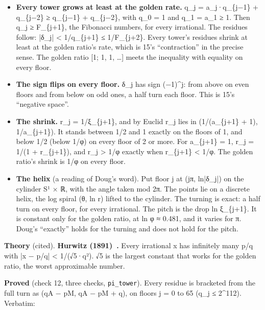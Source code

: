 \begin{itemize}
\item \textbf{Every tower grows at least at the golden rate.} q\_\allowbreak{}j = a\_\allowbreak{}j·q\_\allowbreak{}\{j−1\} + q\_\allowbreak{}\{j−2\} ≥ q\_\allowbreak{}\{j−1\} + q\_\allowbreak{}\{j−2\}, with q\_\allowbreak{}0 = 1 and q\_\allowbreak{}1 = a\_\allowbreak{}1 ≥ 1. Then q\_\allowbreak{}j ≥ F\_\allowbreak{}\{j+1\}, the Fibonacci numbers, for every irrational. The residues follow: |δ\_\allowbreak{}j| < 1/q\_\allowbreak{}\{j+1\} ≤ 1/F\_\allowbreak{}\{j+2\}. Every tower's residues shrink at least at the golden ratio's rate, which is 15's “contraction” in the precise sense. The golden ratio [1; 1, 1, …] meets the inequality with equality on every floor.
\item \textbf{The sign flips on every floor.} δ\_\allowbreak{}j has sign (−1)\textasciicircum{}j: from above on even floors and from below on odd ones, a half turn each floor. This is 15's “negative space”.
\item \textbf{The shrink.} r\_\allowbreak{}j = 1/ξ\_\allowbreak{}\{j+1\}, and by Euclid r\_\allowbreak{}j lies in (1/(a\_\allowbreak{}\{j+1\} + 1), 1/a\_\allowbreak{}\{j+1\}). It stands between 1/2 and 1 exactly on the floors of 1, and below 1/2 (below 1/φ) on every floor of 2 or more. For a\_\allowbreak{}\{j+1\} = 1, r\_\allowbreak{}j = 1/(1 + r\_\allowbreak{}\{j+1\}), and r\_\allowbreak{}j > 1/φ exactly when r\_\allowbreak{}\{j+1\} < 1/φ. The golden ratio's shrink is 1/φ on every floor.
\item \textbf{The helix} (a reading of Doug's word). Put floor j at (jπ, ln|δ\_\allowbreak{}j|) on the cylinder S¹ × ℝ, with the angle taken mod 2π. The points lie on a discrete helix, the log spiral (θ, ln r) lifted to the cylinder. The turning is exact: a half turn on every floor, for every irrational. The pitch is the drop ln ξ\_\allowbreak{}\{j+1\}. It is constant only for the golden ratio, at ln φ ≈ 0.481, and it varies for π. Doug's “exactly” holds for the turning and does not hold for the pitch.
\end{itemize}

\textbf{Theory} (cited). \textbf{Hurwitz (1891)~\cite{src:Hurwitz-1891}.} Every irrational x has infinitely many p/q with |x − p/q| < 1/(√5·q²). √5 is the largest constant that works for the golden ratio, the worst approximable number.

\textbf{Proved} (check 12, three checks, \texttt{pi\_\allowbreak{}tower}). Every residue is bracketed from the full turn as (qA − pM, qA − pM + q), on floors j = 0 to 65 (q\_\allowbreak{}j ≤ 2\textasciicircum{}112). Verbatim:

